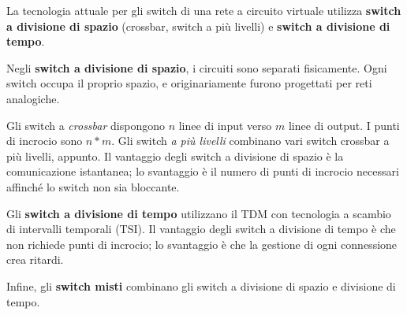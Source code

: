         La tecnologia attuale per gli switch di una rete a circuito virtuale utilizza \textbf{switch a divisione di spazio} (crossbar, switch a più livelli) e \textbf{switch a divisione di tempo}.
        
        \vspace{3mm}
        
        Negli \textbf{switch a divisione di spazio}, i circuiti sono separati fisicamente. Ogni switch occupa il proprio spazio, e originariamente furono progettati per reti analogiche. 
        
        Gli switch a \textit{crossbar} dispongono $n$ linee di input verso $m$ linee di output. I punti di incrocio sono $n*m$. Gli switch \textit{a più livelli} combinano vari switch crossbar a più livelli, appunto. Il vantaggio degli switch a divisione di spazio è la comunicazione istantanea; lo svantaggio è il numero di punti di incrocio necessari affinché lo switch non sia bloccante.
        
        \vspace{3mm}
        
        Gli \textbf{switch a divisione di tempo} utilizzano il TDM con tecnologia a scambio di intervalli temporali (TSI). Il vantaggio degli switch a divisione di tempo è che non richiede punti di incrocio; lo svantaggio è che la gestione di ogni connessione crea ritardi.
        
        \vspace{3mm}
        
        Infine, gli \textbf{switch misti} combinano gli switch a divisione di spazio e divisione di tempo.